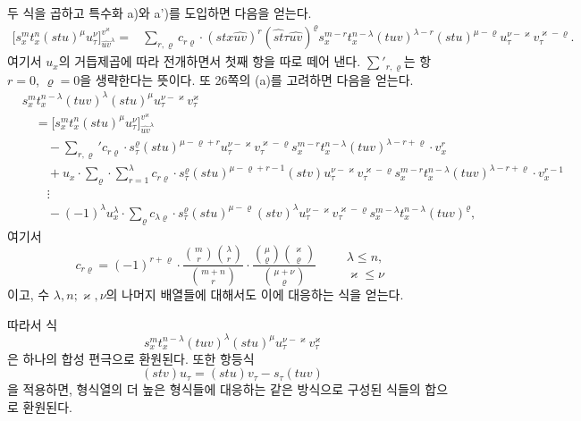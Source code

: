두 식을 곱하고 특수화 a)와 a')를 도입하면 다음을 얻는다.
\[
\begin{aligned}
\bigl[s_x^m t_x^n(stu)^\mu u_\tau^\nu\bigr]_{\widehat{uv}^{\lambda}}^{v^\varkappa}
={}&
\sum_{r,\varrho}c_{r\varrho}\cdot
(stx\widehat{uv})^r(\widehat{st}\tau\widehat{uv})^\varrho
s_x^{m-r}t_x^{n-\lambda}(tuv)^{\lambda-r}(stu)^{\mu-\varrho}
u_\tau^{\nu-\varkappa}v_\tau^{\varkappa-\varrho}.
\end{aligned}
\]
여기서 $u_x$의 거듭제곱에 따라 전개하면서 첫째 항을 따로 떼어 낸다. $\sum'_{r,\varrho}$는 항 $r=0$, $\varrho=0$을 생략한다는 뜻이다. 또 26쪽의 (a)를 고려하면 다음을 얻는다.
\[
\tag{II}
\begin{aligned}
&s_x^m t_x^{n-\lambda}(tuv)^\lambda(stu)^\mu u_\tau^{\nu-\varkappa}v_\tau^\varkappa\\
&\quad =
\bigl[s_x^m t_x^n(stu)^\mu u_\tau^\nu\bigr]_{\widehat{uv}^{\lambda}}^{v^\varkappa}\\
&\qquad
-\sum_{r,\varrho}' c_{r\varrho}\cdot s_\tau^\varrho(stu)^{\mu-\varrho+r}
u_\tau^{\nu-\varkappa}v_\tau^{\varkappa-\varrho}
s_x^{m-r}t_x^{n-\lambda}(tuv)^{\lambda-r+\varrho}\cdot v_x^r\\
&\qquad
+u_x\cdot\sum_{\varrho}\cdot\sum_{r=1}^{\lambda} c_{r\varrho}\cdot
s_\tau^\varrho(stu)^{\mu-\varrho+r-1}(stv)
u_\tau^{\nu-\varkappa}v_\tau^{\varkappa-\varrho}
s_x^{m-r}t_x^{n-\lambda}(tuv)^{\lambda-r+\varrho}\cdot v_x^{r-1}\\
&\qquad
\vdots\\
&\qquad
-(-1)^\lambda u_x^\lambda\cdot\sum_\varrho c_{\lambda\varrho}\cdot
s_\tau^\varrho(stu)^{\mu-\varrho}(stv)^\lambda
u_\tau^{\nu-\varkappa}v_\tau^{\varkappa-\varrho}
s_x^{m-\lambda}t_x^{n-\lambda}(tuv)^\varrho,
\end{aligned}
\]
여기서
\[
c_{r\varrho}=(-1)^{r+\varrho}\cdot
\frac{\binom{m}{r}\binom{\lambda}{r}}{\binom{m+n}{r}}\cdot
\frac{\binom{\mu}{\varrho}\binom{\varkappa}{\varrho}}{\binom{\mu+\nu}{\varrho}}
\qquad
\begin{array}{l}
\lambda\le n,\\
\varkappa\le\nu
\end{array}
\]
이고, 수 $\lambda,n;\varkappa,\nu$의 나머지 배열들에 대해서도 이에 대응하는 식을 얻는다.

따라서 식
\[
s_x^m t_x^{n-\lambda}(tuv)^\lambda(stu)^\mu u_\tau^{\nu-\varkappa}v_\tau^\varkappa
\]
은 하나의 합성 편극으로 환원된다. 또한 항등식
\[
(stv)u_\tau=(stu)v_\tau-s_\tau(tuv)
\]
을 적용하면, 형식열의 더 높은 형식들에 대응하는 같은 방식으로 구성된 식들의 합으로 환원된다.

